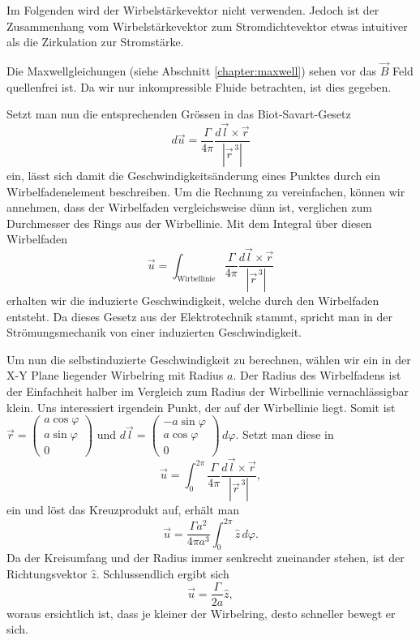 Im Folgenden wird der Wirbelstärkevektor nicht verwenden.
Jedoch ist der Zusammenhang vom Wirbelstärkevektor zum Stromdichtevektor etwas intuitiver als die Zirkulation zur Stromstärke.

Die Maxwellgleichungen (siehe Abschnitt \ref{chapter:maxwell}) sehen vor das \(\vec{B}\) Feld quellenfrei ist. 
Da wir nur inkompressible Fluide betrachten, ist dies gegeben.

Setzt man nun die entsprechenden Grössen in das Biot-Savart-Gesetz
\[
d\vec{u}
=
\frac{\Gamma}{4\pi}\frac{d\vec{l} \times \vec{r}}{\left\lvert \vec{r}^{\,3}\right\rvert }
\]
ein, lässt sich damit die Geschwindigkeitsänderung eines Punktes durch ein Wirbelfadenelement beschreiben.
Um die Rechnung zu vereinfachen, können wir annehmen, dass der Wirbelfaden vergleichsweise dünn ist, verglichen zum Durchmesser des Rings aus der Wirbellinie.
Mit dem Integral über diesen Wirbelfaden
\[
\vec{u}
=
\int_{\text{Wirbellinie}} \frac{\Gamma}{4\pi}\frac{d\vec{l} \times \vec{r}}{\left\lvert \vec{r}^{\,3}\right\rvert}
\]
erhalten wir die induzierte Geschwindigkeit, welche durch den Wirbelfaden entsteht.
Da dieses Gesetz aus der Elektrotechnik stammt, spricht man in der Strömungsmechanik von einer induzierten Geschwindigkeit.

Um nun die selbstinduzierte Geschwindigkeit zu berechnen, wählen wir ein in der X-Y Plane liegender Wirbelring mit Radius \(a\).
Der Radius des Wirbelfadens ist der Einfachheit halber im Vergleich zum Radius der Wirbellinie vernachlässigbar klein.
Uns interessiert irgendein Punkt, der auf der Wirbellinie liegt.
Somit ist
\(
\vec{r} = 
\begin{pmatrix}
    a \cos \varphi\\
    a \sin \varphi\\
    0    
\end{pmatrix}\)
und
\(
d\vec{l} = 
\begin{pmatrix}
    -a \sin \varphi\\
    a \cos \varphi\\
    0    
\end{pmatrix}
\,d\varphi \). 
Setzt man diese in
\[
\vec{u}
=
\int_{0}^{2\pi} \frac{\Gamma }{4\pi}\frac{d \vec{l} \times \vec{r}}{\left\lvert \vec{r}^{\,3}\right\rvert },
\]
ein und löst das Kreuzprodukt auf, erhält man 
\[
\vec{u}
=
\frac{\Gamma a^{2}}{4\pi a^{3}} \int_{0}^{2\pi} \hat{z}\, d\varphi.
\]
Da der Kreisumfang und der Radius immer senkrecht zueinander stehen, ist der Richtungsvektor \(\hat{z}\). 
Schlussendlich ergibt sich
\[
\vec{u}
=
\frac{\Gamma }{2 a}\hat{z},
\]
woraus ersichtlich ist, dass je kleiner der Wirbelring, desto schneller bewegt er sich.

